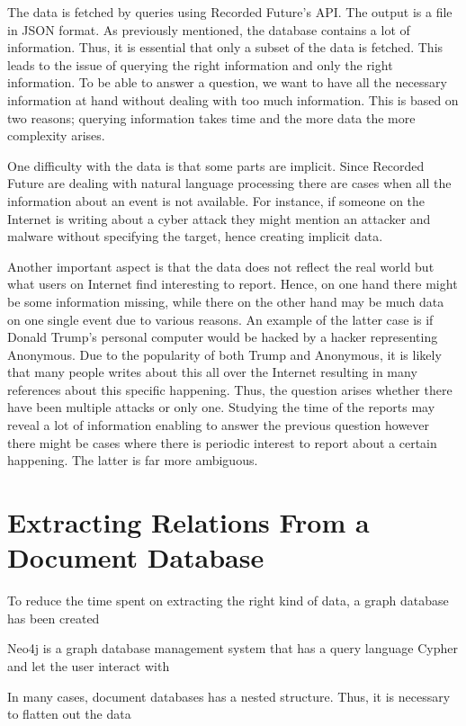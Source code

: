 The data is fetched by queries using Recorded Future's API. The output is a file in JSON format. As previously mentioned, the database contains a lot of information. Thus, it is essential that only a subset of the data is fetched. This leads to the issue of querying the right information and only the right information. To be able to answer a question, we want to have all the necessary information at hand without dealing with too much information. This is based on two reasons; querying information takes time and the more data the more complexity arises.

One difficulty with the data is that some parts are implicit. Since Recorded Future are dealing with natural language processing there are cases when all the information about an event is not available. For instance, if someone on the Internet is writing about a cyber attack they might mention an attacker and malware without specifying the target, hence creating implicit data. 

Another important aspect is that the data does not reflect the real world but what users on Internet find interesting to report. Hence, on one hand there might be some information missing, while there on the other hand may be much data on one single event due to various reasons. An example of the latter case is if Donald Trump's personal computer would be hacked by a hacker representing Anonymous. Due to the popularity of both Trump and Anonymous, it is likely that many people writes about this all over the Internet resulting in many references about this specific happening. Thus, the question arises whether there have been multiple attacks or only one. Studying the time of the reports may reveal a lot of information enabling to answer the previous question however there might be cases where there is periodic interest to report about a certain happening. The latter is far more ambiguous.

\section{Extracting Relations From a Document Database}
To reduce the time spent on extracting the right kind of data, a graph database has been created

Neo4j is a graph database management system that has a query language Cypher and let the user interact with 

In many cases, document databases has a nested structure. Thus, it is necessary to flatten out the data

